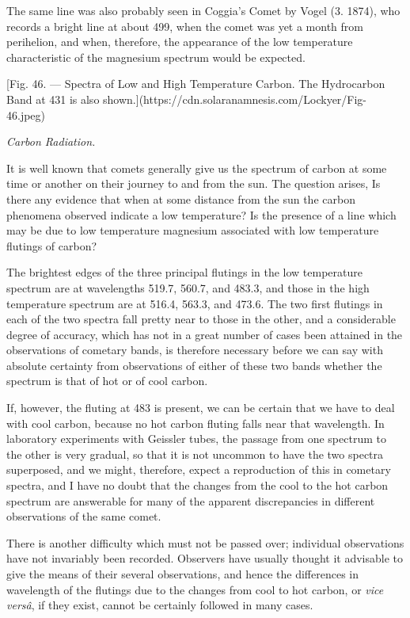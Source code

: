 \documentclass[a4paper, 12pt, oneside, polutonikogreek, english]{article}
\begin{document}
The same line was also probably seen in Coggia's Comet by Vogel (3. 1874), who records a bright line at about 499, when the comet was yet a month from perihelion, and when, therefore, the appearance of the low temperature characteristic of the magnesium spectrum would be expected.

[Fig. 46. --- Spectra of Low and High Temperature Carbon. The Hydrocarbon Band at 431 is also shown.](https://cdn.solaranamnesis.com/Lockyer/Fig-46.jpeg)

\emph{Carbon Radiation.}

It is well known that comets generally give us the spectrum of carbon at some time or another on their journey to and from the sun. The question arises, Is there any evidence that when at some distance from the sun the carbon phenomena observed indicate a low temperature? Is the presence of a line which may be due to low temperature magnesium associated with low temperature flutings of carbon?

The brightest edges of the three principal flutings in the low temperature spectrum are at wavelengths 519.7, 560.7, and 483.3, and those in the high temperature spectrum are at 516.4, 563.3, and 473.6. The two first flutings in each of the two spectra fall pretty near to those in the other, and a considerable degree of accuracy, which has not in a great number of cases been attained in the observations of cometary bands, is therefore necessary before we can say with absolute certainty from observations of either of these two bands whether the spectrum is that of hot or of cool carbon.

If, however, the fluting at 483 is present, we can be certain that we have to deal with cool carbon, because no hot carbon fluting falls near that wavelength. In laboratory experiments with Geissler tubes, the passage from one spectrum to the other is very gradual, so that it is not uncommon to have the two spectra superposed, and we might, therefore, expect a reproduction of this in cometary spectra, and I have no doubt that the changes from the cool to the hot carbon spectrum are answerable for many of the apparent discrepancies in different observations of the same comet.

There is another difficulty which must not be passed over; individual observations have not invariably been recorded. Observers have usually thought it advisable to give the means of their several observations, and hence the differences in wavelength of the flutings due to the changes from cool to hot carbon, or \emph{vice versâ}, if they exist, cannot be certainly followed in many cases.
\end{document}
